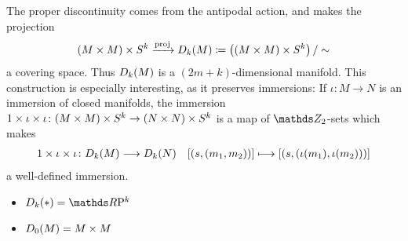 \begin{Rem}\label{rem:twistedprodpreservesimmersions}
  The proper discontinuity comes from the antipodal action, and makes
  the projection
  \begin{gather*}
    \Twistedprodcovspace{k}{M}
    \xrightarrow{\proj}
    \Twistedprod{k}{M}
    \coloneqq
    \left( \Twistedprodcovspace{k}{M} \right)/\sim
  \end{gather*}
  a covering space. Thus $\Twistedprod{k}{M}$ is a
  $(2m+k)$-dimensional manifold.
  This construction is especially interesting, as it preserves
  immersions:
  If $\iota\colon M\to N$ is an immersion of closed manifolds,
  the immersion $1\times\iota\times\iota\colon
  \Twistedprodcovspace{k}{M} \to \Twistedprodcovspace{k}{N}$
  is a map of $\Zmod2$-sets which makes
  \begin{gather*}
    1\times\iota\times\iota\colon
    \Twistedprod{k}{M}\longto\Twistedprod{k}{N}
    \quad [(s,(m_1,m_2))] \longmapsto [(s,(\iota(m_1), \iota(m_2)))]
  \end{gather*}
  a well-defined immersion.
\end{Rem}

\begin{Ex}
  \begin{itemize}
  \item $\Twistedprod k {\pt} = \RP k$
  \item $\Twistedprod 0 {M} = M\times M$
  \end{itemize}
\end{Ex}

